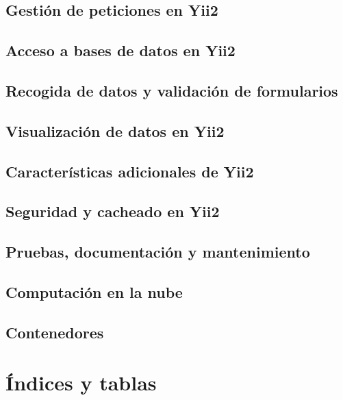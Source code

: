 \documentclass[a4paper,12pt,spanish]{sphinxmanual}
\begin{document}
\chapter{Gestión de peticiones en Yii2}
\label{\detokenize{yii2:gestion-de-peticiones-en-yii2}}

\chapter{Acceso a bases de datos en Yii2}
\label{\detokenize{yii2:acceso-a-bases-de-datos-en-yii2}}

\chapter{Recogida de datos y validación de formularios}
\label{\detokenize{yii2:recogida-de-datos-y-validacion-de-formularios}}

\chapter{Visualización de datos en Yii2}
\label{\detokenize{yii2:visualizacion-de-datos-en-yii2}}

\chapter{Características adicionales de Yii2}
\label{\detokenize{yii2:caracteristicas-adicionales-de-yii2}}

\chapter{Seguridad y cacheado en Yii2}
\label{\detokenize{yii2:seguridad-y-cacheado-en-yii2}}

\chapter{Pruebas, documentación y mantenimiento}
\label{\detokenize{yii2:pruebas-documentacion-y-mantenimiento}}

\chapter{Computación en la nube}
\label{\detokenize{yii2:computacion-en-la-nube}}

\chapter{Contenedores}
\label{\detokenize{yii2:contenedores}}

\part{Índices y tablas}
\label{\detokenize{index_latex:indices-y-tablas}}


\renewcommand{\indexname}{Índice}
\printindex
\end{document}
